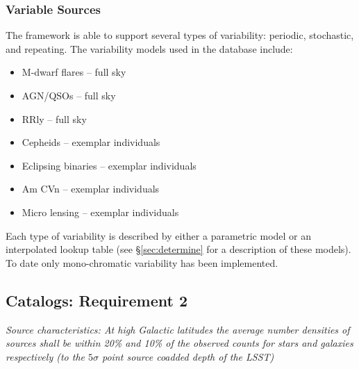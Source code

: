 \documentclass[11pt]{article}
\begin{document}
\subsubsection{Variable Sources}
The framework is able to support several types of variability:
periodic, stochastic, and repeating.  The variability models used in
the database include:
\pagebreak
\begin{itemize}
\item M-dwarf flares -- full sky
\item AGN/QSOs -- full sky
\item RRly -- full sky
\item Cepheids -- exemplar individuals
\item Eclipsing binaries -- exemplar individuals
\item Am CVn -- exemplar individuals
\item Micro lensing -- exemplar individuals
\end{itemize}
Each type of variability is described by either a parametric model or
an interpolated lookup table (see \S\ref{sec:determine} for a
description of these models).  To date only mono-chromatic variability
has been implemented.

\subsection{Catalogs: Requirement 2}

{\it Source characteristics: At high Galactic latitudes the average
  number densities of sources shall be within 20\% and 10\% of the
  observed counts for stars and galaxies respectively (to the
  $5\sigma$ point source coadded depth of the LSST) } \\

\end{document}
